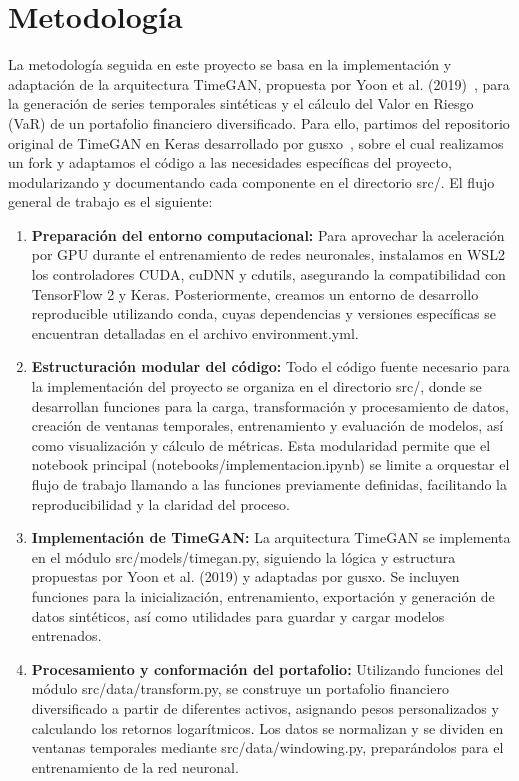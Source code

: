 \documentclass{article}
\renewcommand{\texttt}[1]{{\mononokifont #1}}
\theoremstyle{definition}
\theoremstyle{remark}
\begin{document}
\section{Metodología}
La metodología seguida en este proyecto se basa en la implementación y adaptación de la arquitectura TimeGAN, propuesta por Yoon et al. (2019)~\cite{yoon2019timegan}, para la generación de series temporales sintéticas y el cálculo del Valor en Riesgo (VaR) de un portafolio financiero diversificado. Para ello, partimos del repositorio original de TimeGAN en Keras desarrollado por gusxo~\cite{gusxo2021timegan_keras}, sobre el cual realizamos un fork y adaptamos el código a las necesidades específicas del proyecto, modularizando y documentando cada componente en el directorio \texttt{src/}.
El flujo general de trabajo es el siguiente:
\begin{enumerate}
\item \textbf{Preparación del entorno computacional:} Para aprovechar la aceleración por GPU durante el entrenamiento de redes neuronales, instalamos en WSL2 los controladores CUDA, cuDNN y cdutils, asegurando la compatibilidad con TensorFlow 2 y Keras. Posteriormente, creamos un entorno de desarrollo reproducible utilizando \texttt{conda}, cuyas dependencias y versiones específicas se encuentran detalladas en el archivo \texttt{environment.yml}.
\item \textbf{Estructuración modular del código:} Todo el código fuente necesario para la implementación del proyecto se organiza en el directorio \texttt{src/}, donde se desarrollan funciones para la carga, transformación y procesamiento de datos, creación de ventanas temporales, entrenamiento y evaluación de modelos, así como visualización y cálculo de métricas. Esta modularidad permite que el notebook principal (\texttt{notebooks/implementacion.ipynb}) se limite a orquestar el flujo de trabajo llamando a las funciones previamente definidas, facilitando la reproducibilidad y la claridad del proceso.
\item \textbf{Implementación de TimeGAN:} La arquitectura TimeGAN se implementa en el módulo \texttt{src/models/timegan.py}, siguiendo la lógica y estructura propuestas por Yoon et al. (2019) y adaptadas por gusxo. Se incluyen funciones para la inicialización, entrenamiento, exportación y generación de datos sintéticos, así como utilidades para guardar y cargar modelos entrenados.
\item \textbf{Procesamiento y conformación del portafolio:} Utilizando funciones del módulo \texttt{src/data/transform.py}, se construye un portafolio financiero diversificado a partir de diferentes activos, asignando pesos personalizados y calculando los retornos logarítmicos. Los datos se normalizan y se dividen en ventanas temporales mediante \texttt{src/data/windowing.py}, preparándolos para el entrenamiento de la red neuronal.

\end{enumerate}
\end{document}
